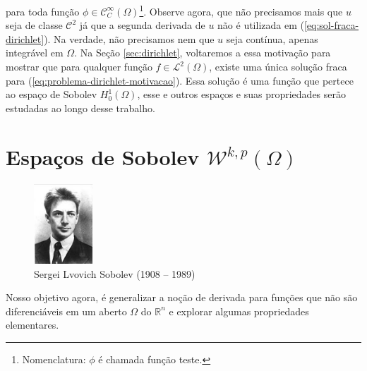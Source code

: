 \documentclass[a4paper, 11pt]{book}
\theoremstyle{definition}
\newcommand{\bR}{\mathbb{R}}
\newcommand{\cC}{\mathcal{C}}
\newcommand{\cL}{\mathcal{L}}
\newcommand{\cW}{\mathcal{W}}
\begin{document}
para toda função $\phi \in \cC^{\infty}_C(\Omega)$\footnote{Nomenclatura: $\phi$ é chamada função teste.}.
Observe agora, que não precisamos mais que $u$ seja de classe $\cC^2$ já que a segunda derivada de $u$ não é utilizada em (\ref{eq:sol-fraca-dirichlet}). Na verdade, não precisamos nem que $u$ seja contínua, apenas integrável em $\Omega$.
Na Seção \ref{sec:dirichlet}, voltaremos a essa motivação para mostrar que para qualquer função $f \in \cL^2(\Omega)$, existe uma única solução fraca para (\ref{eq:problema-dirichlet-motivacao}). 
Essa solução é uma função que pertece ao espaço de Sobolev $H^1_0(\Omega)$, esse e outros espaços e suas propriedades serão estudadas ao longo desse trabalho.


\section{Espaços de Sobolev $\cW^{k,p}(\Omega)$}

\begin{figure}
    \centering
    \includegraphics[height=3cm]{sobolev.jpg}
    \caption{Sergei Lvovich Sobolev (1908 -- 1989)}
\end{figure}

Nosso objetivo agora, é generalizar a noção de derivada para funções que não são diferenciáveis em um aberto $\Omega$ do $\bR^n$ e explorar algumas propriedades elementares.
\end{document}
